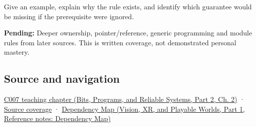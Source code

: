 \hypertarget{appendix-2e4d494c2d94-recall-and-next-depth}{}

Give an example, explain why the rule exists, and identify which guarantee would be missing if the prerequisite were ignored.

\textbf{Pending:} Deeper ownership, pointer/reference, generic programming and module rules from later sources. This is written coverage, not demonstrated personal mastery.

\subsection{Source and navigation}\label{appendix-2e4d494c2d94-source-and-navigation}

\hypertarget{appendix-2e4d494c2d94-source-and-navigation}{}

\href{../01-Bits-Programs-and-Reliable-Systems-P02/main.pdf\#01-foundations-i-ch002-promises-become-definitions}{C007 teaching chapter (Bits, Programs, and Reliable Systems, Part 2, Ch. 2)} · \hyperref[appendix-fd090d982a15-m007---parts-101-112]{Source coverage} · \href{../07-Vision-XR-and-Playable-Worlds-P01/main.pdf\#appendix-4ad47bdd269a}{Dependency Map (Vision, XR, and Playable Worlds, Part 1, Reference notes: Dependency Map)}
